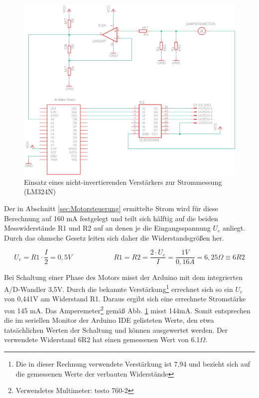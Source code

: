 \documentclass[11pt, titlepage]{report}
\begin{document}
				\begin{figure}[htbp]
					\centering
					\includegraphics[width=\linewidth]{./img/op2.png}
					\caption[Einsatz eines nicht-invertierenden Verstärkers zur Strommessung]{Einsatz eines nicht-invertierenden Verstärkers zur Strommessung (LM324N)
					\label{fig:imgOP}}			
				\end{figure}
				\newpage

				Der in Abschnitt \ref{sec:Motorsteuerung} ermittelte Strom wird für diese Berechnung auf 160 mA festgelegt und teilt sich hälftig auf die beiden Messwiderstände R1 und R2 auf an denen je die Eingangsspannung $U_{e}$ anliegt. Durch das ohmsche Gesetz leiten sich daher die Widerstandsgrößen her.

				\begin{equation}
					U_{e}=R1\cdot\frac{I}{2}=0,5V \hspace{6em} R1=R2=\frac{2\cdot U_{e}}{I}=\frac{1V}{0,16A}=6,25\Omega \equiv 6R2
				\end{equation}

				Bei Schaltung einer Phase des Motors misst der Arduino mit dem integrierten A/D-Wandler 3,5V. Durch die bekannte Verstärkung\footnote{Die in dieser Rechnung verwendete Verstärkung ist 7,94 und bezieht sich auf die gemessenen Werte der verbauten Widerstände} errechnet sich so ein $U_{e}$ von 0,441V am Widerstand R1. Daraus ergibt sich eine errechnete Stromstärke von 145 mA. Das Amperemeter\footnote{Verwendetes Multimeter: testo 760-2} gemäß Abb. \ref{fig:imgOP} misst 144mA. Somit entsprechen die im seriellen Monitor der Arduino IDE gelisteten Werte, den etwa tatsächlichen Werten der Schaltung und können ausgewertet werden. Der verwendete Widerstand 6R2 hat einen gemessenen Wert von 6.1$\Omega$.
\end{document}
